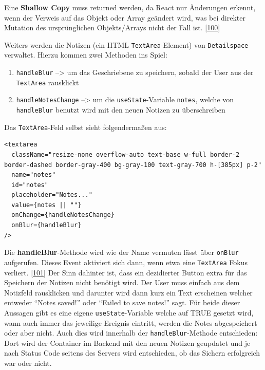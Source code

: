 \documentclass[
    headings=optiontotocandhead,%
    twoside,
    numbers=noenddot,%
    12pt, %
    titlepage, %
    parskip=full, %
    listof=leveldown, 
    numbers=noenddot, %
    a4paper,DIV=14,
    BCOR=15mm,
]{scrbook}
\newcommand{\passthrough}[1]{#1}
\renewenvironment{quote}{\begin{customblockquote}\list{}{\rightmargin=0em\leftmargin=0em}%
\item\relax\color{blockquote-text}\ignorespaces}{\unskip\unskip\endlist\end{customblockquote}}
\providecommand{\tightlist}{%
  \setlength{\itemsep}{0pt}\setlength{\parskip}{0pt}}
\begin{document}
\begin{quote}
Eine \textbf{Shallow Copy} muss returned werden, da React nur Änderungen
erkennt, wenn der Verweis auf das Objekt oder Array geändert wird, was
bei direkter Mutation des ursprünglichen Objekts/Arrays nicht der Fall
ist. {[}\protect\hyperlink{ref-gpt-updateTableData}{100}{]}
\end{quote}

Weiters werden die Notizen (ein HTML
\passthrough{\lstinline!TextArea!}-Element) von
\passthrough{\lstinline!Detailspace!} verwaltet. Hierzu kommen zwei
Methoden ins Spiel:

\begin{enumerate}
\def\labelenumi{\arabic{enumi}.}
\tightlist
\item
  \passthrough{\lstinline!handleBlur!} --\textgreater{} um das
  Geschriebene zu speichern, sobald der User aus der
  \passthrough{\lstinline!TextArea!} rausklickt
\item
  \passthrough{\lstinline!handleNotesChange!} --\textgreater{} um die
  \passthrough{\lstinline!useState!}-Variable
  \passthrough{\lstinline!notes!}, welche von
  \passthrough{\lstinline!handleBlur!} benutzt wird mit den neuen
  Notizen zu überschreiben
\end{enumerate}

Das \passthrough{\lstinline!TextArea!}-Feld selbst sieht folgendermaßen
aus:

\begin{lstlisting}[caption={TextArea Tag des Notiz-Felds}]
<textarea
  className="resize-none overflow-auto text-base w-full border-2 border-dashed border-gray-400 bg-gray-100 text-gray-700 h-[385px] p-2"
  name="notes"
  id="notes"
  placeholder="Notes..."
  value={notes || ""}
  onChange={handleNotesChange}
  onBlur={handleBlur}
/>
\end{lstlisting}

Die \textbf{handleBlur}-Methode wird wie der Name vermuten lässt über
\passthrough{\lstinline!onBlur!} aufgerufen. Dieses Event aktiviert sich
dann, wenn etwa eine \passthrough{\lstinline!TextArea!} Fokus verliert.
{[}\protect\hyperlink{ref-GeeksForGeeks-onBlur}{101}{]} Der Sinn
dahinter ist, dass ein dezidierter Button extra für das Speichern der
Notizen nicht benötigt wird. Der User muss einfach aus dem Notizfeld
rausklicken und darunter wird dann kurz ein Text erscheinen welcher
entweder ``Notes saved!'' oder ``Failed to save notes!'' sagt. Für beide
dieser Aussagen gibt es eine eigene
\passthrough{\lstinline!useState!}-Variable welche auf TRUE gesetzt
wird, wann auch immer das jeweilige Ereignis eintritt, werden die Notes
abgespeichert oder aber nicht. Auch dies wird innerhalb der
\passthrough{\lstinline!handleBlur!}-Methode entschieden: Dort wird der
Container im Backend mit den neuen Notizen geupdatet und je nach Status
Code seitens des Servers wird entschieden, ob das Sichern erfolgreich
war oder nicht.
\end{document}
